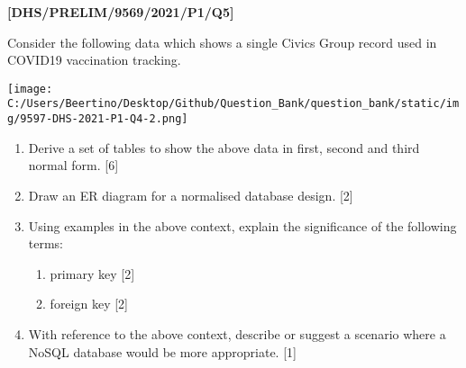 \item \textbf{{[}DHS/PRELIM/9569/2021/P1/Q5{]} }

Consider the following data which shows a single Civics Group record
used in COVID19 vaccination tracking. 
\noindent \begin{center}
\texttt{[image: C:/Users/Beertino/Desktop/Github/Question\_Bank/question\_bank/static/img/9597-DHS-2021-P1-Q4-2.png]}
\par\end{center}
\begin{enumerate}
\item Derive a set of tables to show the above data in first, second and
third normal form. \hfill{}{[}6{]}
\item Draw an ER diagram for a normalised database design. \hfill{} {[}2{]}
\item Using examples in the above context, explain the significance of the
following terms:
\begin{enumerate}
\item primary key \hfill{}{[}2{]}
\item foreign key \hfill{}{[}2{]}
\end{enumerate}
\item With reference to the above context, describe or suggest a scenario
where a NoSQL database would be more appropriate. \hfill{} {[}1{]}
\end{enumerate}